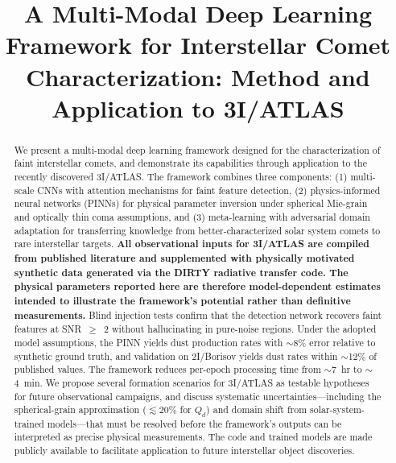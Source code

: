 \documentclass[preprint2]{aastex631}
\begin{document}
\title{A Multi-Modal Deep Learning Framework for Interstellar Comet Characterization: Method and Application to 3I/ATLAS}

%
%

\accepted{}
\published{}

\begin{abstract}
We present a multi-modal deep learning framework designed for the characterization of faint interstellar comets, and demonstrate its capabilities through application to the recently discovered 3I/ATLAS. The framework combines three components: (1) multi-scale CNNs with attention mechanisms for faint feature detection, (2) physics-informed neural networks (PINNs) for physical parameter inversion under spherical Mie-grain and optically thin coma assumptions, and (3) meta-learning with adversarial domain adaptation for transferring knowledge from better-characterized solar system comets to rare interstellar targets. \textbf{All observational inputs for 3I/ATLAS are compiled from published literature and supplemented with physically motivated synthetic data generated via the DIRTY radiative transfer code. The physical parameters reported here are therefore model-dependent estimates intended to illustrate the framework's potential rather than definitive measurements.} Blind injection tests confirm that the detection network recovers faint features at SNR~$\geq$~2 without hallucinating in pure-noise regions. Under the adopted model assumptions, the PINN yields dust production rates with $\sim$8\% error relative to synthetic ground truth, and validation on 2I/Borisov yields dust rates within $\sim$12\% of published values. The framework reduces per-epoch processing time from $\sim$7~hr to $\sim$4~min. We propose several formation scenarios for 3I/ATLAS as testable hypotheses for future observational campaigns, and discuss systematic uncertainties---including the spherical-grain approximation ($\lesssim 20\%$ for $Q_d$) and domain shift from solar-system-trained models---that must be resolved before the framework's outputs can be interpreted as precise physical measurements. The code and trained models are made publicly available to facilitate application to future interstellar object discoveries.
\end{abstract}
\end{document}
